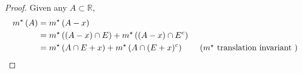 \documentclass[11pt]{article}
\newcommand{\mstar}[1]{m^{\star}\left(#1\right)}
\begin{document}
    \begin{proof}
        Given any $A \subset \mathbb{R}$,
        \begin{align*}
            \mstar{A} &= \mstar{A - x} \\
            &= \mstar{(A - x) \cap E} + \mstar{(A-x) \cap E^c}  \\
            &= \mstar{A \cap E + x} + \mstar{A \cap (E+x)^c} \tag{$m^{\star}$ translation invariant }
        \end{align*}
    \end{proof}
\end{document}
